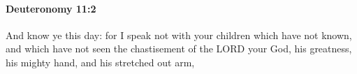 
		\paragraph{Deuteronomy 11:2} %
			\label{DEUTERONOMY-11-2}

			And know ye this day: for I speak not with your children which have not known, and which have not seen the chastisement of the LORD your God, his greatness, his mighty hand, and his stretched out arm,


